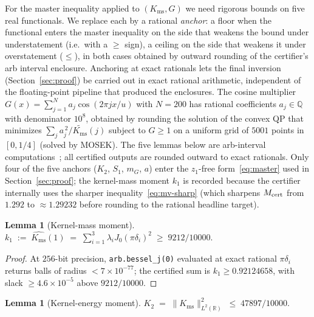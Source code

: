 \documentclass[11pt, letterpaper]{article}
\theoremstyle{paperplain}
\newtheorem{lemma}[theorem]{Lemma}
\theoremstyle{paperdef}
\newcommand{\R}{\mathbb{R}}
\newcommand{\Q}{\mathbb{Q}}
\newcommand{\Kms}{K_{\mathrm{ms}}}
\begin{document}
For the master inequality applied to $(\Kms,G)$ we need rigorous
bounds on five real functionals.  We replace each by a rational
\emph{anchor}: a floor when the functional enters the master
inequality on the side that weakens the bound under understatement
(i.e.\ with a $\ge$ sign), a ceiling on the side that weakens it
under overstatement ($\le$), in both cases obtained by outward
rounding of the certifier's arb interval enclosure.  Anchoring at
exact rationals lets the final inversion (Section~\ref{sec:proof}) be
carried out in exact rational arithmetic, independent of the
floating-point pipeline that produced the enclosures.  The cosine multiplier
$G(x)=\sum_{j=1}^{N}a_j\cos(2\pi jx/u)$ with $N=200$ has rational
coefficients $a_j\in\Q$ with denominator $10^{8}$, obtained by
rounding the solution of the convex QP that minimizes
$\sum_j a_j^{\,2}/\widetilde{\Kms}(j)$ subject to $G\ge 1$ on a
uniform grid of $5001$ points in $[0, 1/4]$ (solved by MOSEK).  The
five lemmas below are arb-interval computations~\cite{Flint}; all
certified outputs are rounded outward to exact rationals.  Only four
of the five anchors ($K_2$, $S_1$, $m_G$, $a$) enter the
$z_1$-free form~\eqref{eq:master} used in Section~\ref{sec:proof};
the kernel-mass moment $k_1$ is recorded because the certifier
internally uses the sharper inequality~\eqref{eq:mv-sharp} (which
sharpens $M_{\rm cert}$ from $1.292$ to $\approx 1.29232$ before
rounding to the rational headline target).

\begin{lemma}[Kernel-mass moment]
\label{lem:k1}
\(
  k_1 \;:=\; \widehat{\Kms}(1)
  \;=\; \sum_{i=1}^{3}\lambda_i J_0(\pi\delta_i)^2
  \;\ge\; 9212/10000.
\)
\end{lemma}

\begin{proof}
At $256$-bit precision, \texttt{arb.bessel\_j(0)} evaluated at exact
rational $\pi\delta_i$ returns balls of radius $<7\times 10^{-77}$;
the certified sum is $k_1\ge 0.92124658$, with slack
$\ge 4.6\times 10^{-5}$ above $9212/10000$.
\end{proof}

\begin{lemma}[Kernel-energy moment]
\label{lem:K2}
\(
  K_2 \;=\; \|\Kms\|_{L^2(\R)}^{2}
  \;\le\; 47897/10000.
\)
\end{lemma}
\end{document}
